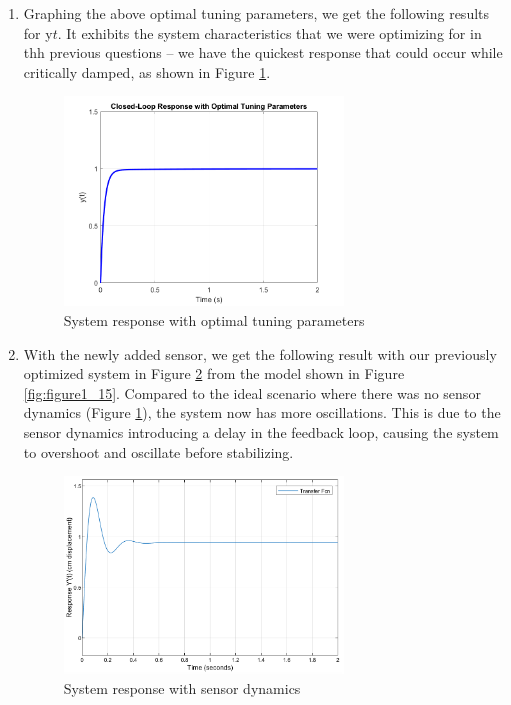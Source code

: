 \documentclass[12pt]{article}
\begin{document}
\begin{enumerate}
\begin{enumerate}
    \item
    Graphing the above optimal tuning parameters, we get the following results for y\(t\). It exhibits the system characteristics that we were optimizing for in thh previous questions -- we have the quickest response that could occur while critically damped, as shown in Figure \ref{fig:figure1_13}.

    \begin{figure}[H]
      \centering
      \includegraphics[width=0.7\textwidth]{Figures/figure1_13.png}
      \caption{System response with optimal tuning parameters}
      \label{fig:figure1_13}
    \end{figure}

    \item With the newly added sensor, we get the following result with our previously optimized system in Figure \ref{fig:figure1_14} from the model shown in Figure \ref{fig:figure1_15}. Compared to the ideal scenario where there was no sensor dynamics (Figure \ref{fig:figure1_13}), the system now has more oscillations. This is due to the sensor dynamics introducing a delay in the feedback loop, causing the system to overshoot and oscillate before stabilizing.

    \begin{figure}[H]
      \centering
      \includegraphics[width=0.7\textwidth]{Figures/figure1_14.png}
      \caption{System response with sensor dynamics}
      \label{fig:figure1_14}
    \end{figure}


\end{enumerate}
\end{enumerate}
\end{document}
